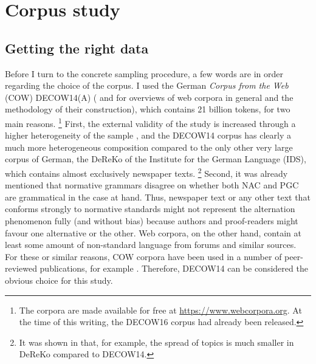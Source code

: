 \documentclass[USenglish]{article}
\begin{document}
\section{Corpus study}
\label{sec:corpusstudies}


\subsection{Getting the right data}
\label{sec:gettingdata}


Before I turn to the concrete sampling procedure, a few words are in order regarding the choice of the corpus.
I used the German \textit{Corpus from the Web} (COW) DECOW14(A) (\citealp{SchaeferBildhauer2012full,Schaefer2015b} and \citealp{BiemannEa2013,SchaeferBildhauer2013} for overviews of web corpora in general and the methodology of their construction), which contains 21 billion tokens, for two main reasons.%
\footnote{The corpora are made available for free at \url{https://www.webcorpora.org}.
At the time of this writing, the DECOW16 corpus had already been released.}
First, the external validity of the study is increased through a higher heterogeneity of the sample \citep[30]{MaxwellDelaney2004}, and the DECOW14 corpus has clearly a much more heterogeneous composition compared to the only other very large corpus of German, the DeReKo \citep{KupietzEa2010} of the Institute for the German Language (IDS), which contains almost exclusively newspaper texts.%
\footnote{It was shown in \cite{W16-2601} that, for example, the spread of topics is much smaller in DeReKo compared to DECOW14.}
Second, it was already mentioned that normative grammars disagree on whether both NAC and PGC are grammatical in the case at hand.
Thus, newspaper text or any other text that conforms strongly to normative standards might not represent the alternation phenomenon fully (and without bias) because authors and proof-readers might favour one alternative or the other.
Web corpora, on the other hand, contain at least some amount of non-standard language from forums and similar sources.
For these or similar reasons, COW corpora have been used in a number of peer-reviewed publications, for example \cite{VanGoethemHiligsmann2014,VanGoethemHuening2015,MuellerS2014,Schaefer2016c,SchaeferSayatz2014,SchaeferSayatz2016,StefanowitschFlach2016,Zimmer2015}. 
Therefore, DECOW14 can be considered the obvious choice for this study.
\end{document}
